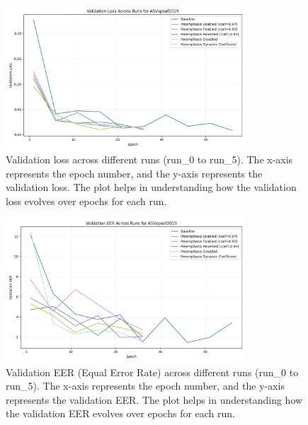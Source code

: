\documentclass{article} %
\begin{document}
\begin{figure}[h]
    \centering
    \includegraphics[width=0.8\textwidth]{val_loss_ASVspoof2019_across_runs.png}
    \caption{Validation loss across different runs (run\_0 to run\_5). The x-axis represents the epoch number, and the y-axis represents the validation loss. The plot helps in understanding how the validation loss evolves over epochs for each run.}
    \label{fig:val_loss}
\end{figure}

\begin{figure}[h]
    \centering
    \includegraphics[width=0.8\textwidth]{val_eer_ASVspoof2019_across_runs.png}
    \caption{Validation EER (Equal Error Rate) across different runs (run\_0 to run\_5). The x-axis represents the epoch number, and the y-axis represents the validation EER. The plot helps in understanding how the validation EER evolves over epochs for each run.}
    \label{fig:val_eer}
\end{figure}
\end{document}
